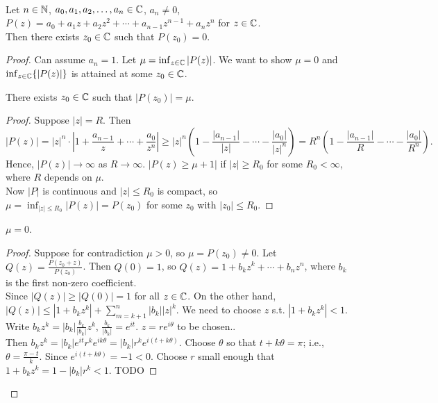 \begin{thm}\\
	Let $n \in \mathbb{N}$, $a_{0},a_{1},a_{2},\ldots ,a_n \in \mathbb{C}$, $a_n\neq 0$,\\
	$P(z)=a_{0}+a_{1}z+a_{2}z^2+\cdots + a_{n-1}z^{n-1}+a_n z^{n}$ for $z \in \mathbb{C}$.\\
	Then there exists $z_{0} \in \mathbb{C}$ such that $P(z_{0})=0$.
	\begin{proof}
		Can assume $a_n=1$. Let $\mu=\inf_{z \in \mathbb{C}}\left|P(z)\right|$.
		We want to show $\mu=0$ and $\inf_{z \in \mathbb{C}}\{\left|P(z)\right|\}$ is attained at some $z_{0} \in \mathbb{C}$.
		\begin{claim}[1]
			There exists $z_{0} \in \mathbb{C}$ such that $\left|P(z_{0})\right|=\mu$.
			\begin{proof}
				Suppose $\left|z\right|=R$. Then
				\[
					\left|P(z)\right|= \left|z\right|^{n} \cdot \left|1+ \frac{a_{n-1}}{z}+ \cdots + \frac{a_{0}}{z^{n}}\right|\ge \left|z\right|^{n} \left(1- \frac{\left|a_{n-1}\right|}{\left|z\right|}- \cdots - \frac{\left|a_0\right|}{\left|z\right|^{n}}\right)=R^{n}\left(1- \frac{\left|a_{n-1}\right|}{R}- \cdots - \frac{\left|a_0\right|}{R^{n}}\right)
					.\]
				Hence, $\left|P(z)\right|\to \infty$ as $R\to \infty$.
				$\left|P(z)\ge \mu+1\right|$ if $\left|z\right|\ge R_{0}$ for some $R_{0}<\infty$, where $R$ depends on $\mu$.\\
				Now $\left|P\right|$ is continuous and $\left|z\right|\le R_{0}$ is compact, so $\mu=\inf_{\left|z\right|\le R_{0}}\left|P(z)\right|=P(z_{0})$ for some $z_{0}$ with $\left|z_{0}\right|\le R_{0}$.
			\end{proof}
		\end{claim}
		\begin{claim}[2]
			$\mu=0$.
			\begin{proof}
				Suppose for contradiction $\mu>0$, so $\mu=P(z_{0})\neq 0$. Let $Q(z)= \frac{P(z_{0}+z)}{P(z_{0})}$. Then $Q(0)=1$, so $Q(z)=1+b_{k}z^{k}+ \cdots + b_n z^{n}$, where $b_k$ is the first non-zero coefficient.\\
				Since $\left|Q(z)\right|\ge \left|Q(0)\right|=1$ for all $z \in \mathbb{C}$.
				On the other hand, $\left|Q(z)\right|\le \left|1+b_k z^{k}\right|+ \sum_{m=k+1}^{n}{\left|b_k\right| \left|z\right|^{k}}$.
				We need to choose $z$ s.t. $\left|1+b_kz^{k}\right|<1$.\\
				Write $b_{k}z^{k}=\left|b_k\right| \frac{b_k}{\left|b_k\right|}z^{k}$, $\frac{b_k}{\left|b_k\right|}=e^{it}$. $z=re^{i\theta}$ to be chosen..\\
				Then $b_k z^{k}=\left|b_k\right|e^{it}r^{k}e^{ik \theta}=\left|b_k\right|r^{k} e^{i(t+k \theta)}$. Choose $\theta$ so that $t+k\theta=\pi$; i.e., $\theta=\frac{\pi-t}{k}$.
				Since $e^{i(t+k \theta)}=-1<0$.
				Choose $r$ small enough that $1+b_k z^{k}=1- \left|b_k\right|r^{k}<1$. TODO
			\end{proof}
		\end{claim}
	\end{proof}
\end{thm}
